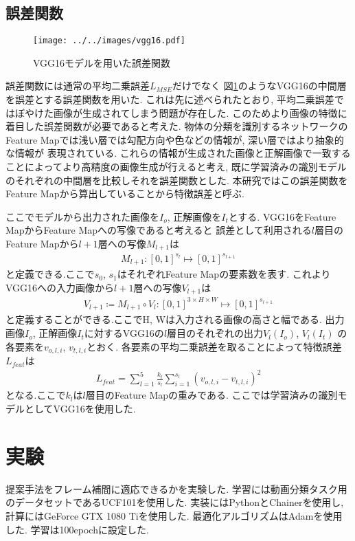 \documentclass[twocolumn,a4j,uplatex]{jsarticle}
\begin{document}
\subsection{誤差関数}
\begin{figure}[htbp]
    \centering
    \texttt{[image: ../../images/vgg16.pdf]}
    \caption{VGG16モデルを用いた誤差関数}
    \label{fig:vgg16loss}
\end{figure}

誤差関数には通常の平均二乗誤差$L_{MSE}$だけでなく
図\ref{fig:vgg16loss}のようなVGG16\cite{VGG16}の中間層を誤差とする誤差関数を用いた.
これは先に述べられたとおり, 平均二乗誤差ではぼやけた画像が生成されてしまう問題が存在した.
このためより画像の特徴に着目した誤差関数が必要であると考えた.
物体の分類を識別するネットワークのFeature Mapでは浅い層では勾配方向や色などの情報が, 深い層ではより抽象的な情報が
表現されている. これらの情報が生成された画像と正解画像で一致することによってより高精度の画像生成が行えると考え,
既に学習済みの識別モデルのそれぞれの中間層を比較しそれを誤差関数とした.
本研究ではこの誤差関数をFeature Mapから算出していることから特徴誤差と呼ぶ.

ここでモデルから出力された画像を$I_o$, 正解画像を$I_t$とする.
VGG16をFeature MapからFeature Mapへの写像であると考えると
誤差として利用される$l$層目のFeature Mapから$l+1$層への写像$M_{l+1}$は
\begin{align}
    M_{l+1} : [0, 1]^{s_l} \mapsto [0, 1]^{s_{l+1}}
\end{align}
と定義できる.ここで$s_0$, $s_1$はそれぞれFeature Mapの要素数を表す.
これよりVGG16への入力画像から$l+1$層への写像$V_{l+1}$は
\begin{align}
    V_{l+1} \coloneqq M_{l+1} \circ V_l : [0, 1]^{3 \times H \times W} \mapsto [0, 1]^{s_{l+1}}
\end{align}
と定義することができる.ここでH, Wは入力される画像の高さと幅である.
出力画像$I_o$, 正解画像$I_t$に対するVGG16の$l$層目のそれぞれの出力$V_{l}(I_o)$, $V_{l}(I_t)$
の各要素を$v_{o,l,i}$, $v_{t,l,i}$とおく.
各要素の平均二乗誤差を取ることによって特徴誤差$L_{feat}$は
\begin{align}
    L_{feat} = \sum_{l=1}^5 \frac{k_l}{s_l} \sum_{i=1}^{s_l} (v_{o,l,i}-v_{t,l,i})^2
\end{align}
となる.ここで$k_l$は$l$層目のFeature Mapの重みである.
ここでは学習済みの識別モデルとしてVGG16\cite{VGG16}を使用した.

\section{実験}
提案手法をフレーム補間に適応できるかを実験した.
学習には動画分類タスク用のデータセットであるUCF101\cite{UCF101}を使用した.
実装にはPythonとChainer\cite{chainer_learningsys2015}を使用し, 計算にはGeForce GTX 1080 Tiを使用した.
最適化アルゴリズムはAdam\cite{kingma2014adam}を使用した. 学習は100epochに設定した.
\end{document}
